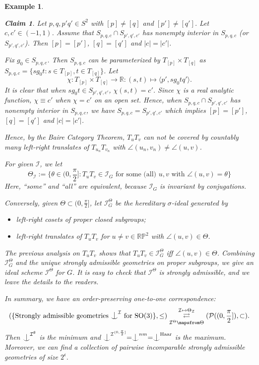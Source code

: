 \documentclass{article}
\newtheorem{example}[definition]{Example}
\newtheorem*{claim}{Claim}
\newenvironment{claimproof}[1][\proofname]
               {
                 \proof[#1]
                 \renewcommand*\qedsymbol{$\square$\rlap{\textsubscript{Claim}}}
               }
               {
                 \endproof
               }
\newcommand{\R}{\mathbb{R}}
\newcommand{\I}{\mathcal{I}}
\newcommand{\HH}{\mathrm{Haar}}
\newcommand{\SO}{\mathrm{SO}}
\newcommand{\RP}{\mathbb{RP}}
\newcommand{\ind}{\mathrel{\raise0.2ex\hbox{\ooalign{\hidewidth$\vert$\hidewidth\cr\raise-0.9ex\hbox{$\smile$}}}}}
\begin{document}
\begin{example}
\begin{claim}
Let $p,q,p'q'\in S^2$ with $[p]\neq [q]$ and $[p']\neq [q']$. Let $c,c'\in (-1,1)$. Assume that $S_{p,q,c}\cap S_{p',q',c'}$ has nonempty interior in $S_{p,q,c}$ (or $S_{p',q',c'}$). Then $[p]=[p']$, $[q]=[q']$ and $|c|=|c'|$.
\end{claim}
\begin{claimproof}
Fix $g_0\in S_{p,q,c}$. Then $S_{p,q,c}$ can be parameterized by $T_{[p] }\times T_{[q]}$ as $S_{p,q,c}=\{sg_0t:s\in T_{[p]}, t\in T_{[q]}\}$. Let $$\chi: T_{[p] }\times T_{[q]}\rightarrow \R: (s,t)\mapsto \langle p', sg_0tq' \rangle.$$
It is clear that when $sg_0t\in S_{p',q',c'}$, $\chi(s,t)=c'$. Since $\chi$ is a real analytic function, $\chi\equiv c'$ when $\chi=c'$ on an open set. Hence, when $S_{p,q,c}\cap S_{p',q',c'}$ has nonempty interior in $S_{p,q,c}$, we have $S_{p,q,c}=S_{p',q',c'}$ which implies $[p]=[p']$, $[q]=[q']$ and $|c|=|c'|$.
\end{claimproof}

Hence, by the Baire Category Theorem, $T_uT_v$ can not be covered by countably many left-right translates of $T_{u_n}T_{v_n}$ with $\angle(u_n,v_n)\neq \angle(u,v)$.

For given $\I$, we let $$\Theta_\I:=\{\theta\in(0,\frac{\pi}{2}]: T_u T_v\in \I_G \text{ for some (all) } u,v \text{ with } \angle(u,v)=\theta \}$$
Here, ``some'' and ``all'' are equivalent, because $\I_G$ is invariant by conjugations. 

Conversely, given $\Theta\subset(0,\frac{\pi}{2}]$, let 
$\I_G^\Theta$ be the hereditary $\sigma$-ideal generated by 
\begin{itemize}
\item left-right cosets of proper closed subgroups;
\item left-right translates of $T_uT_v$ for $u\neq v\in \RP^2$ with $\angle(u,v)\in\Theta$.
\end{itemize}

The previous analysis on $T_uT_v$  shows that $T_u T_v\in \I_G^\Theta$ iff $\angle(u,v)\in \Theta$. Combining $\I_G^\Theta$ and the unique strongly admissible geometries on proper subgroups, we give an ideal scheme $\I^\Theta$ for $G$. It is easy to check that $\I^\Theta$ is strongly admissible, and we leave the details to the readers.

In summary, we have an order-preserving one-to-one correspondence:
$$(\{\text{Strongly admissible geometries $\ind^\I$ for } \SO(3) \},\leq) \overset{\I\mapsto \Theta_\I}{\underset{\I^\Theta\mapsfrom\Theta}{\rightleftarrows}}(\mathcal{P}((0,\frac{\pi}{2}]),\subset).$$
Then $\ind^{\I^\emptyset}$ is the minimum and $\ind^{\I^{(0,\frac{\pi}{2}]}}=\ind^{nm}=\ind^\HH$ is the maximum. Moreover, we can find a collection of pairwise incomparable strongly admissible geometries of size $2^\mathfrak{c}$.
\end{example}
\end{document}
